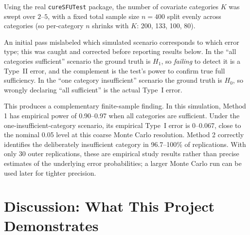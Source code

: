 \documentclass[11pt]{article}
\begin{document}
Using the real \texttt{cureSFUTest} package, the number of covariate categories
$K$ was swept over $2$--$5$, with a fixed total sample size $n=400$ split evenly
across categories (so per-category $n$ shrinks with $K$: 200, 133, 100, 80).

An initial pass mislabeled which simulated scenario corresponds to which error
type; this was caught and corrected before reporting results below. In the
``all categories sufficient'' scenario the ground truth is $H_1$, so \emph{failing}
to detect it is a Type~II error, and the complement is the test's power to confirm
true full sufficiency. In the ``one category insufficient'' scenario the ground
truth is $H_0$, so wrongly declaring ``all sufficient'' is the actual Type~I error.

\begin{table}[h]
\centering
\caption{Method 1 (intersection-union test) power and Type~I error, and Method 2 selection accuracy, as $K$ grows.}
\end{table}

This produces a complementary finite-sample finding. In this simulation, Method 1 has
empirical power of 0.90--0.97 when all categories are sufficient. Under the
one-insufficient-category scenario, its empirical Type~I error is 0--0.067, close to
the nominal 0.05 level at this coarse Monte Carlo resolution. Method 2 correctly
identifies the deliberately insufficient category in 96.7--100\% of replications.
With only 30 outer replications, these are empirical study results rather than
precise estimates of the underlying error probabilities; a larger Monte Carlo run
can be used later for tighter precision.


\section{Discussion: What This Project Demonstrates}
\end{document}
